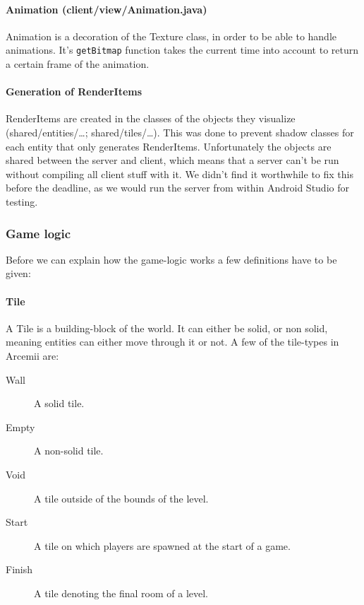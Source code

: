 \documentclass[../main.tex]{subfiles}
\begin{document}
        \paragraph{Animation (\tiny client/view/Animation.java\normalsize)} Animation is a decoration of the Texture class, in order to be able to handle animations. It's \texttt{getBitmap} function takes the current time into account to return a certain frame of the animation.

        \paragraph{Generation of RenderItems} RenderItems are created in the classes of the objects they visualize (\tiny shared/entities/\dots; shared/tiles/\dots\normalsize). This was done to prevent shadow classes for each entity that only generates RenderItems. Unfortunately the objects are shared between the server and client, which means that a server can't be run without compiling all client stuff with it. We didn't find it worthwhile to fix this before the deadline, as we would run the server from within Android Studio for testing. 

        
        \subsubsection{Game logic}
        Before we can explain how the game-logic works a few definitions have to be given:

        \paragraph{Tile} A Tile is a building-block of the world. It can either be solid, or non solid, meaning entities can either move through it or not. A few of the tile-types in Arcemii are:
        \begin{description}
            \item[Wall] A solid tile.
            \item[Empty] A non-solid tile.
            \item[Void] A tile outside of the bounds of the level.
            \item[Start] A tile on which players are spawned at the start of a game.
            \item[Finish] A tile denoting the final room of a level.
        \end{description}
\end{document}
